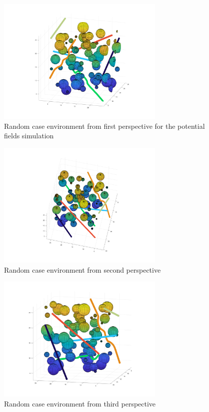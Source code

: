 \documentclass[journal]{IEEEtran}
\begin{document}
\begin{figure}[H]
			\centering
			\includegraphics[width=8cm]{Results/Potentialfields/env_1}
			\caption{Random case environment from first perspective for the potential fields simulation}
			\label{fig:env_1}
		\end{figure}	
		\begin{figure}[H]
			\centering
			\includegraphics[width=8cm]{Results/Potentialfields/env_2}
			\caption{Random case environment from second perspective}
			\label{fig:env_2}
		\end{figure}	
		\begin{figure}[H]
			\centering
			\includegraphics[width=8cm]{Results/Potentialfields/env_3}
			\caption{Random case environment from third perspective}
			\label{fig:env_3}
		\end{figure}	
\end{document}
